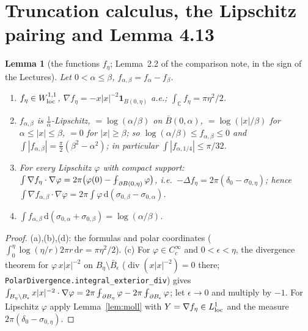 \documentclass[11pt]{article}
\newtheorem{lemma}[theorem]{Lemma}
\theoremstyle{definition}
\theoremstyle{remark}
\newcommand{\C}{\mathbb C}
\newcommand{\dd}{\,\mathrm d}
\newcommand{\avg}{\fint}
\DeclareMathOperator{\Div}{div}
\def\fint{\mathop{\,\rlap{--}\!\!\int}\nolimits}
\begin{document}
\section{Truncation calculus, the Lipschitz pairing and Lemma 4.13}\label{sec:mono}

\begin{lemma}[the functions $f_\eta$; Lemma~2.2 of the comparison note, in the sign of the Lectures]\label{lem:f}
Let $0<\alpha\le\beta$, $f_{\alpha,\beta}=f_\alpha-f_\beta$.
\begin{enumerate}[label=(\alph*)]
\item $f_\eta\in W^{1,1}_{\rm loc}$, $\nabla f_\eta=-x|x|^{-2}\mathbf 1_{B(0,\eta)}$ a.e.; $\int_\C f_\eta=\pi\eta^2/2$.
\item $f_{\alpha,\beta}$ is $\frac1\alpha$-Lipschitz, $=\log(\alpha/\beta)$ on $\bar B(0,\alpha)$, $=\log(|x|/\beta)$ for
  $\alpha\le|x|\le\beta$, $=0$ for $|x|\ge\beta$; so $\log(\alpha/\beta)\le f_{\alpha,\beta}\le0$ and
  $\int|f_{\alpha,\beta}|=\frac\pi2(\beta^2-\alpha^2)$; in particular $\int|f_{\alpha,1/4}|\le\pi/32$.
\item For every Lipschitz $\varphi$ with compact support: $\int\nabla f_\eta\cdot\nabla\varphi=2\pi\bigl(\varphi(0)-\avg_{\partial B(0,\eta)}\varphi\bigr)$,
  i.e.\ $-\Delta f_\eta=2\pi(\delta_0-\sigma_{0,\eta})$; hence $\int\nabla f_{\alpha,\beta}\cdot\nabla\varphi=2\pi\int\varphi\dd(\sigma_{0,\beta}-\sigma_{0,\alpha})$.
\item $\int f_{\alpha,\beta}\dd(\sigma_{0,\alpha}+\sigma_{0,\beta})=\log(\alpha/\beta)$.
\end{enumerate}
\end{lemma}
\begin{proof}
(a),(b),(d): the formulas and polar coordinates ($\int_0^\eta\log(\eta/r)2\pi r\dd r=\pi\eta^2/2$).
(c) For $\varphi\in C^\infty_c$ and $0<\epsilon<\eta$, the divergence theorem for $\varphi\,x|x|^{-2}$ on $B_\eta\setminus\bar B_\epsilon$
($\Div(x|x|^{-2})=0$ there; \texttt{PolarDivergence.integral\_exterior\_div}) gives
$\int_{B_\eta\setminus B_\epsilon}x|x|^{-2}\cdot\nabla\varphi=2\pi\avg_{\partial B_\eta}\varphi-2\pi\avg_{\partial B_\epsilon}\varphi$;
let $\epsilon\to0$ and multiply by $-1$. For Lipschitz $\varphi$ apply Lemma~\ref{lem:moll} with $Y=\nabla f_\eta\in L^1_{\rm loc}$ and the measure
$2\pi(\delta_0-\sigma_{0,\eta})$.
\end{proof}
\end{document}
